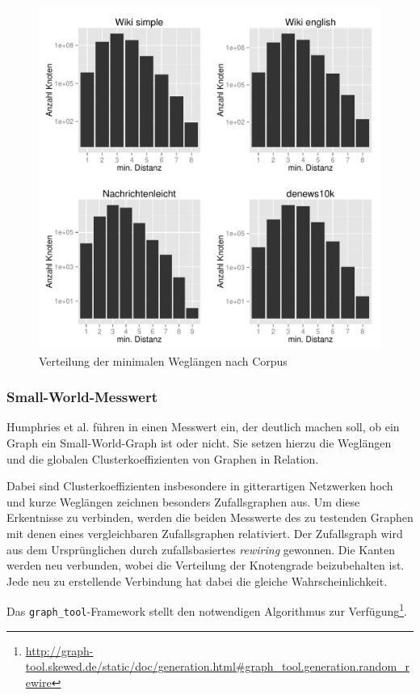 \documentclass[11pt, a4paper]{article}
\begin{document}
\begin{figure}[ht]
    \centering
        \includegraphics[scale=.75]{mdh_plots.pdf}
    \caption{Verteilung der minimalen Weglängen nach Corpus}
    \label{fig-mdh}
\end{figure}


\subsubsection{Small-World-Messwert}
Humphries et al. führen in \cite{Humphries2006} einen Messwert ein, der deutlich
machen soll, ob ein Graph ein Small-World-Graph ist oder nicht. Sie setzen hierzu
die Weglängen und die globalen Clusterkoeffizienten von Graphen in Relation.

Dabei sind Clusterkoeffizienten insbesondere in gitterartigen Netzwerken hoch und
kurze Weglängen zeichnen besonders Zufallsgraphen aus. Um diese Erkentnisse zu
verbinden, werden die beiden Messwerte des zu testenden Graphen mit denen eines
vergleichbaren Zufallsgraphen relativiert. Der Zufallsgraph wird aus dem 
Ursprünglichen durch zufallsbasiertes \emph{rewiring} gewonnen.
Die Kanten werden neu verbunden, wobei die Verteilung der Knotengrade
beizubehalten ist.
Jede neu zu erstellende Verbindung hat dabei die gleiche Wahrscheinlichkeit.

Das \texttt{graph\_tool}-Framework stellt den notwendigen Algorithmus zur 
Verfügung\footnote{\url{http://graph-tool.skewed.de/static/doc/generation.html\#graph_tool.generation.random_rewire}}.
\end{document}
